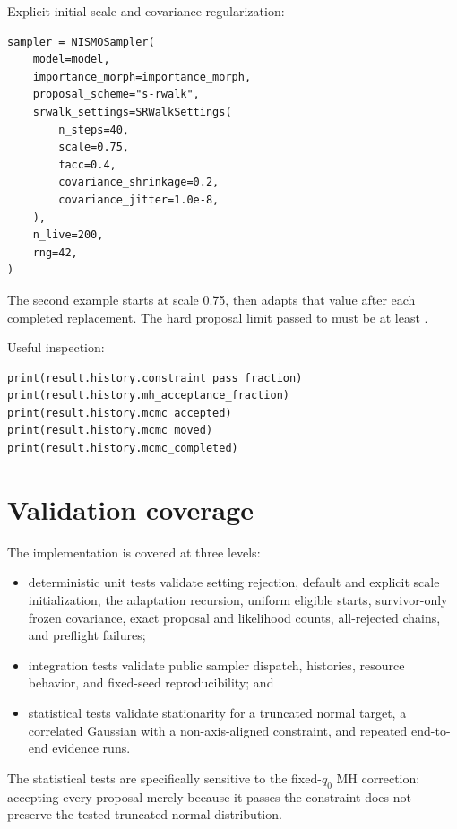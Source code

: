 \documentclass[11pt,a4paper]{article}
\newcommand{\code}[1]{\texttt{\detokenize{#1}}}
\begin{document}
Explicit initial scale and covariance regularization:

\begin{lstlisting}
sampler = NISMOSampler(
    model=model,
    importance_morph=importance_morph,
    proposal_scheme="s-rwalk",
    srwalk_settings=SRWalkSettings(
        n_steps=40,
        scale=0.75,
        facc=0.4,
        covariance_shrinkage=0.2,
        covariance_jitter=1.0e-8,
    ),
    n_live=200,
    rng=42,
)
\end{lstlisting}

The second example starts at scale 0.75, then adapts that value after each
completed replacement.  The hard proposal limit passed to
\code{NISMOSampler.run()} must be at least \code{n_steps}.

Useful inspection:

\begin{lstlisting}
print(result.history.constraint_pass_fraction)
print(result.history.mh_acceptance_fraction)
print(result.history.mcmc_accepted)
print(result.history.mcmc_moved)
print(result.history.mcmc_completed)
\end{lstlisting}

\section{Validation coverage}

The implementation is covered at three levels:

\begin{itemize}
  \item deterministic unit tests validate setting rejection, default and
        explicit scale initialization, the adaptation recursion, uniform
        eligible starts, survivor-only frozen covariance, exact proposal and
        likelihood counts, all-rejected chains, and preflight failures;
  \item integration tests validate public sampler dispatch, histories,
        resource behavior, and fixed-seed reproducibility; and
  \item statistical tests validate stationarity for a truncated normal target,
        a correlated Gaussian with a non-axis-aligned constraint, and repeated
        end-to-end evidence runs.
\end{itemize}

The statistical tests are specifically sensitive to the fixed-\(q_0\) MH
correction: accepting every proposal merely because it passes the constraint
does not preserve the tested truncated-normal distribution.
\end{document}
